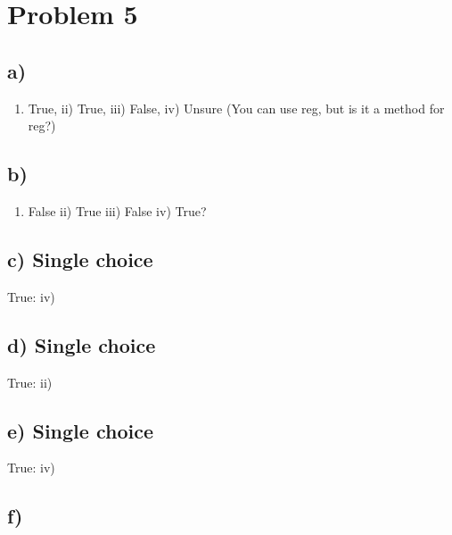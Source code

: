 \documentclass[
]{article}
\providecommand{\tightlist}{%
  \setlength{\itemsep}{0pt}\setlength{\parskip}{0pt}}
\begin{document}
\hypertarget{problem-5}{%
\section{Problem 5}\label{problem-5}}

\hypertarget{a-4}{%
\subsection{a)}\label{a-4}}

\begin{enumerate}
\def\labelenumi{\roman{enumi})}
\tightlist
\item
  True, ii) True, iii) False, iv) Unsure (You can use reg, but is it a
  method for reg?)
\end{enumerate}

\hypertarget{b-4}{%
\subsection{b)}\label{b-4}}

\begin{enumerate}
\def\labelenumi{\roman{enumi})}
\tightlist
\item
  False ii) True iii) False iv) True?
\end{enumerate}

\hypertarget{c-single-choice}{%
\subsection{c) Single choice}\label{c-single-choice}}

True: iv)

\hypertarget{d-single-choice}{%
\subsection{d) Single choice}\label{d-single-choice}}

True: ii)

\hypertarget{e-single-choice}{%
\subsection{e) Single choice}\label{e-single-choice}}

True: iv)

\hypertarget{f-1}{%
\subsection{f)}\label{f-1}}
\end{document}
